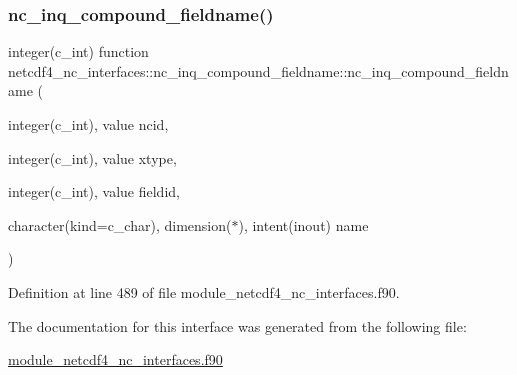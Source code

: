 \subsubsection{\texorpdfstring{nc\+\_\+inq\+\_\+compound\+\_\+fieldname()}{nc\_inq\_compound\_fieldname()}}
{\footnotesize\ttfamily integer(c\+\_\+int) function netcdf4\+\_\+nc\+\_\+interfaces\+::nc\+\_\+inq\+\_\+compound\+\_\+fieldname\+::nc\+\_\+inq\+\_\+compound\+\_\+fieldname (\begin{DoxyParamCaption}\item[{integer(c\+\_\+int), value}]{ncid,  }\item[{integer(c\+\_\+int), value}]{xtype,  }\item[{integer(c\+\_\+int), value}]{fieldid,  }\item[{character(kind=c\+\_\+char), dimension($\ast$), intent(inout)}]{name }\end{DoxyParamCaption})}



Definition at line 489 of file module\+\_\+netcdf4\+\_\+nc\+\_\+interfaces.\+f90.



The documentation for this interface was generated from the following file\+:\begin{DoxyCompactItemize}
\item 
\hyperlink{module__netcdf4__nc__interfaces_8f90}{module\+\_\+netcdf4\+\_\+nc\+\_\+interfaces.\+f90}\end{DoxyCompactItemize}
